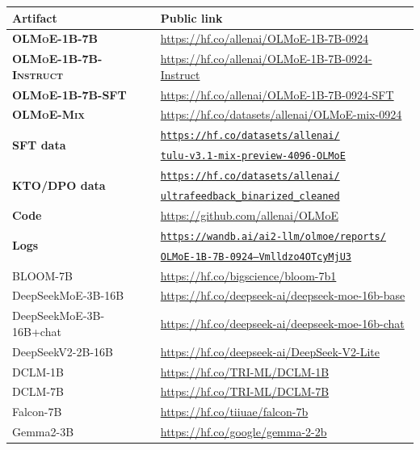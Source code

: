 \documentclass{article}
\newcommand{\data}{\textbf{\textsc{OLMoE-Mix}}}
\newcommand{\modelsmall}{\textbf{\textsc{OLMoE-1B-7B}}}
\newcommand{\modelsmallsft}{\textbf{\textsc{OLMoE-1B-7B-SFT}}}
\newcommand{\modelsmalldpo}{\textbf{\textsc{OLMoE-1B-7B-Instruct}}}
\begin{document}
\begin{table}[htbp]
\centering
\begin{tabular}{l|l}
\toprule
\textbf{Artifact} & \textbf{Public link} \\
\midrule
\modelsmall{} & \url{https://hf.co/allenai/OLMoE-1B-7B-0924} \\
\modelsmalldpo{} & \url{https://hf.co/allenai/OLMoE-1B-7B-0924-Instruct} \\
\modelsmallsft{} & \url{https://hf.co/allenai/OLMoE-1B-7B-0924-SFT} \\
\data{} & \url{https://hf.co/datasets/allenai/OLMoE-mix-0924} \\
\multirow{2}{*}{\textbf{SFT data}} & \href{https://hf.co/datasets/allenai/tulu-v3.1-mix-preview-4096-OLMoE}{\texttt{https://hf.co/datasets/allenai/}} \\
& \href{https://hf.co/datasets/allenai/tulu-v3.1-mix-preview-4096-OLMoE}{\texttt{tulu-v3.1-mix-preview-4096-OLMoE}} \\
\multirow{2}{*}{\textbf{KTO/DPO data}} & \href{https://hf.co/datasets/allenai/ultrafeedback_binarized_cleaned}{\texttt{https://hf.co/datasets/allenai/}} \\
& \href{https://hf.co/datasets/allenai/ultrafeedback_binarized_cleaned}{\texttt{ultrafeedback\_binarized\_cleaned}} \\
\textbf{Code} & \url{https://github.com/allenai/OLMoE} \\
\multirow{2}{*}{\textbf{Logs}} & \href{https://wandb.ai/ai2-llm/olmoe/reports/OLMoE-1B-7B-0924--Vmlldzo4OTcyMjU3}{\texttt{https://wandb.ai/ai2-llm/olmoe/reports/}} \\
& \href{https://wandb.ai/ai2-llm/olmoe/reports/OLMoE-1B-7B-0924--Vmlldzo4OTcyMjU3}{\texttt{OLMoE-1B-7B-0924--Vmlldzo4OTcyMjU3}} \\
\midrule
BLOOM-7B & \url{https://hf.co/bigscience/bloom-7b1} \\
DeepSeekMoE-3B-16B & \url{https://hf.co/deepseek-ai/deepseek-moe-16b-base} \\
DeepSeekMoE-3B-16B+chat & \url{https://hf.co/deepseek-ai/deepseek-moe-16b-chat} \\
DeepSeekV2-2B-16B & \url{https://hf.co/deepseek-ai/DeepSeek-V2-Lite} \\
DCLM-1B & \url{https://hf.co/TRI-ML/DCLM-1B} \\
DCLM-7B & \url{https://hf.co/TRI-ML/DCLM-7B} \\
Falcon-7B & \url{https://hf.co/tiiuae/falcon-7b} \\
Gemma2-3B & \url{https://hf.co/google/gemma-2-2b} \\

\end{tabular}
\end{table}
\end{document}
